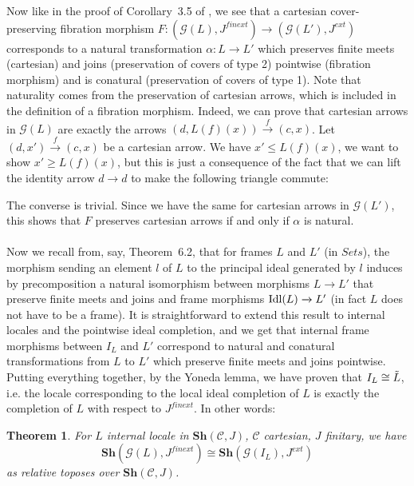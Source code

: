 \documentclass{article}
\newtheorem{theorem}{Theorem}
\newcommand{\id}{\operatorname{id}}
\begin{document}
Now like in the proof of Corollary~3.5 of \cite{caramello2022fibred}, we see that a cartesian cover-preserving fibration morphism $F:(\mathcal{G}(L),J^{finext})\xrightarrow{}(\mathcal{G}(L'),J^{ext})$ corresponds to a natural transformation $\alpha:L\xrightarrow{}L'$ which preserves finite meets (cartesian) and joins (preservation of covers of type 2) pointwise (fibration morphism) and is conatural (preservation of covers of type 1). Note that naturality comes from the preservation of cartesian arrows, which is included in the definition of a fibration morphism. Indeed, we can prove that cartesian arrows in $\mathcal{G}(L)$ are exactly the arrows $(d,L(f)(x))\xrightarrow{f}(c,x)$. Let $(d,x')\xrightarrow{f}(c,x)$ be a cartesian arrow. We have $x'\leq L(f)(x)$, we want to show $x'\geq L(f)(x)$, but this is just a consequence of the fact that we can lift the identity arrow $d\xrightarrow{}d$ to make the following triangle commute:
\begin{center}
    \end{center}
The converse is trivial. Since we have the same for cartesian arrows in $\mathcal{G}(L')$, this shows that $F$ preserves cartesian arrows if and only if $\alpha$ is natural. \\
\\
Now we recall from, say, \cite{caramello2011topos} Theorem~6.2, that for frames $L$ and $L'$ (in $Sets$), the morphism sending an element $l$ of $L$ to the principal ideal generated by $l$ induces by precomposition a natural isomorphism between morphisms $L\xrightarrow{}L'$ that preserve finite meets and joins and frame morphisms $\textup{Idl}(L)\xrightarrow{}L'$ (in fact $L$ does not have to be a frame). It is straightforward to extend this result to internal locales and the pointwise ideal completion, and we get that internal frame morphisms between $I_L$ and $L'$ correspond to natural and conatural transformations from $L$ to $L'$ which preserve finite meets and joins pointwise. Putting everything together, by the Yoneda lemma, we have proven that $I_L\cong \Tilde{L}$, i.e. the locale corresponding to the local ideal completion of $L$ is exactly the completion of $L$ with respect to $J^{finext}$. In other words:

\begin{theorem}\label{loc_ideal}
    For $L$ internal locale in $\mathbf{Sh}(\mathcal{C},J)$, $\mathcal{C}$ cartesian, $J$ finitary, we have $$\mathbf{Sh}(\mathcal{G}(L),J^{finext})\cong \mathbf{Sh}(\mathcal{G}(I_L),J^{ext})$$ as relative toposes over $\mathbf{Sh}(\mathcal{C},J)$.
\end{theorem}
\end{document}
